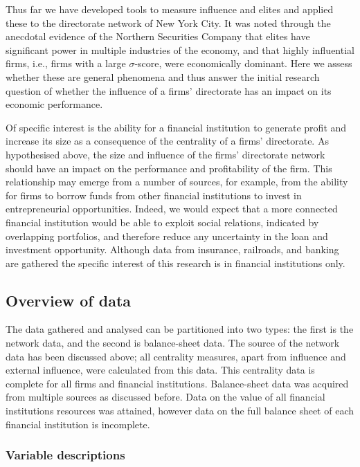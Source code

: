 Thus far we have developed tools to measure influence and elites and applied these to the directorate network of New York City. It was noted through the anecdotal evidence of the Northern Securities Company that elites have significant power in multiple industries of the economy, and that highly influential firms, i.e., firms with a large $\sigma$-score, were economically dominant. Here we assess whether these are general phenomena and thus answer the initial research question of whether the influence of a firms' directorate has an impact on its economic performance.

Of specific interest is the ability for a financial institution to generate profit and increase its size as a consequence of the centrality of a firms' directorate. As hypothesised above, the size and influence of the firms' directorate network should have an impact on the performance and profitability of the firm. This relationship may emerge from a number of sources, for example, from the ability for firms to borrow funds from other financial institutions to invest in entrepreneurial opportunities. Indeed, we would expect that a more connected financial institution would be able to exploit social relations, indicated by overlapping portfolios, and therefore reduce any uncertainty in the loan and investment opportunity. Although data from insurance, railroads, and banking are gathered the specific interest of this research is in financial institutions only.

\subsection{Overview of data}

The data gathered and analysed can be partitioned into two types: the first is the network data, and the second is balance-sheet data. The source of the network data has been discussed above; all centrality measures, apart from influence and external influence, were calculated from this data. This centrality data is complete for all firms and financial institutions. Balance-sheet data was acquired from multiple sources as discussed before. Data on the value of all financial institutions resources was attained, however data on the full balance sheet of each financial institution is incomplete.

\subsubsection*{Variable descriptions}

